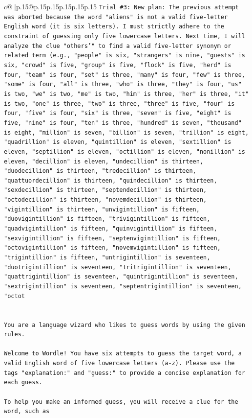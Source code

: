 \documentclass{article}
\begin{document}
{\begin{supertabular}{c@{$\;$}|p{.15\linewidth}@{}p{.15\linewidth}p{.15\linewidth}p{.15\linewidth}p{.15\linewidth}p{.15\linewidth}}
{{{\texttt{Trial \#3: New plan: The previous attempt was aborted because the word "aliens" is not a valid five{-}letter English word (it is six letters). I must strictly adhere to the constraint of guessing only five lowercase letters. Next time, I will analyze the clue "others'" to find a valid five{-}letter synonym or related term (e.g., "people" is six, "strangers" is nine, "guests" is six, "crowd" is five, "group" is five, "flock" is five, "herd" is four, "team" is four, "set" is three, "many" is four, "few" is three, "some" is four, "all" is three, "who" is three, "they" is four, "us" is two, "we" is two, "me" is two, "him" is three, "her" is three, "it" is two, "one" is three, "two" is three, "three" is five, "four" is four, "five" is four, "six" is three, "seven" is five, "eight" is five, "nine" is four, "ten" is three, "hundred" is seven, "thousand" is eight, "million" is seven, "billion" is seven, "trillion" is eight, "quadrillion" is eleven, "quintillion" is eleven, "sextillion" is eleven, "septillion" is eleven, "octillion" is eleven, "nonillion" is eleven, "decillion" is eleven, "undecillion" is thirteen, "duodecillion" is thirteen, "tredecillion" is thirteen, "quattuordecillion" is thirteen, "quindecillion" is thirteen, "sexdecillion" is thirteen, "septendecillion" is thirteen, "octodecillion" is thirteen, "novemdecillion" is thirteen, "vigintillion" is thirteen, "unvigintillion" is fifteen, "duovigintillion" is fifteen, "trivigintillion" is fifteen, "quadvigintillion" is fifteen, "quinvigintillion" is fifteen, "sexvigintillion" is fifteen, "septenvigintillion" is fifteen, "octovigintillion" is fifteen, "novemvigintillion" is fifteen, "trigintillion" is fifteen, "untrigintillion" is seventeen, "duotrigintillion" is seventeen, "tritrigintillion" is seventeen, "quattrigintillion" is seventeen, "quintrigintillion" is seventeen, "sextrigintillion" is seventeen, "septentrigintillion" is seventeen, "octot} \\
\\ 
\\ 
\texttt{You are a language wizard who likes to guess words by using the given rules.} \\
\\ 
\texttt{Welcome to Wordle! You have six attempts to guess the target word, a valid English word of five lowercase letters (a{-}z). Please use the tags "explanation:" and "guess:" to provide a concise explanation for each guess.} \\
\\ 
\texttt{To help you make an informed guess, you will receive a clue for the word, such as} \\
}}}
\end{supertabular}}
\end{document}
